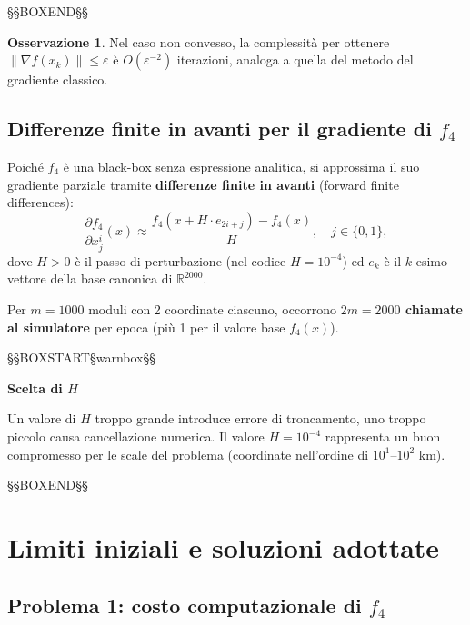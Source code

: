 \documentclass[12pt,a4paper]{article}
\theoremstyle{definition}
\newtheorem{remark}[theorem]{Osservazione}
\newcommand{\R}{\mathbb{R}}
\newcommand{\grad}{\nabla}
\begin{document}
\noindent §§BOXEND§§



\begin{remark}
Nel caso non convesso, la complessità per ottenere $\|\grad f(x_k)\| \leq \varepsilon$ è
$O(\varepsilon^{-2})$ iterazioni, analoga a quella del metodo del gradiente classico.
\end{remark}

\subsection{Differenze finite in avanti per il gradiente di $f_4$}

Poiché $f_4$ è una black-box senza espressione analitica, si approssima il suo gradiente
parziale tramite \textbf{differenze finite in avanti} (forward finite differences):
\[
  \frac{\partial f_4}{\partial x^i_j}(x) \approx
  \frac{f_4(x + H \cdot e_{2i+j}) - f_4(x)}{H},
  \quad j \in \{0,1\},
\]
dove $H > 0$ è il passo di perturbazione (nel codice $H = 10^{-4}$) ed $e_k$ è il $k$-esimo
vettore della base canonica di $\R^{2000}$.

Per $m = 1000$ moduli con 2 coordinate ciascuno, occorrono \textbf{$2m = 2000$ chiamate al
simulatore} per epoca (più 1 per il valore base $f_4(x)$).



\noindent §§BOXSTART§warnbox§§

\textbf{Scelta di $H$}


Un valore di $H$ troppo grande introduce errore di troncamento, uno troppo piccolo causa
cancellazione numerica. Il valore $H = 10^{-4}$ rappresenta un buon compromesso per le scale
del problema (coordinate nell'ordine di $10^1$–$10^2$ km).


\noindent §§BOXEND§§



\section{Limiti iniziali e soluzioni adottate}

\subsection{Problema 1: costo computazionale di $f_4$}
\end{document}
